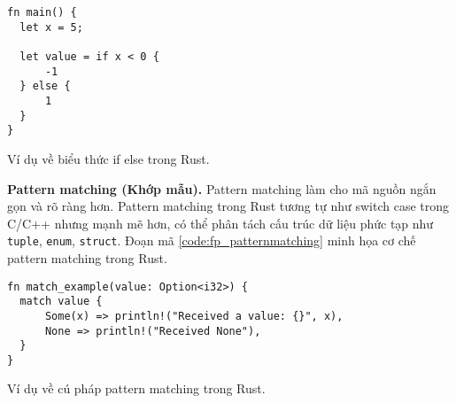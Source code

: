 \begin{listing}[H]
\begin{verbatim}
fn main() {
  let x = 5;

  let value = if x < 0 {
      -1
  } else {
      1
  }
}
\end{verbatim}
\caption{Ví dụ về biểu thức if else trong Rust.}
\label{code:fp_expression}
\end{listing}

\textbf{Pattern matching (Khớp mẫu).}
Pattern matching làm cho mã nguồn ngắn gọn và rõ ràng hơn.
Pattern matching trong Rust tương tự như switch case trong C/C++ nhưng mạnh mẽ hơn, có thể phân tách cấu trúc dữ liệu phức tạp như \texttt{tuple}, \texttt{enum}, \texttt{struct}.
Đoạn mã \ref{code:fp_patternmatching} minh họa cơ chế pattern matching trong Rust.

\begin{listing}[H]
\begin{verbatim}
fn match_example(value: Option<i32>) {
  match value {
      Some(x) => println!("Received a value: {}", x),
      None => println!("Received None"),
  }
}
\end{verbatim}
\caption{Ví dụ về cú pháp pattern matching trong Rust.}
\label{code:fp_patternmatching}
\end{listing}




